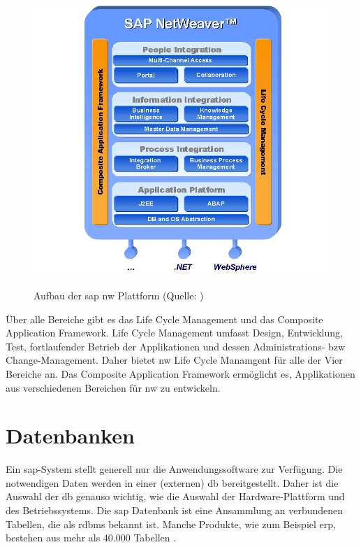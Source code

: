 \begin{figure}[H]
	\begin{center}
	\includegraphics[width=1\linewidth]{grafiken/NetWeaver.png}
	\vspace{-20pt}
	\caption{Aufbau der \gls{sap} \gls{nw} Plattform (Quelle: \cite{NWGrundlagen})}
	\vspace{-10pt}
	\label{abb:SAPNWGrundlagen}
	\end{center}
\end{figure}

Über alle Bereiche gibt es das Life Cycle Management und das Composite Application Framework. Life Cycle Management umfasst Design, Entwicklung, Test, fortlaufender Betrieb der Applikationen und dessen Administrations- \gls{bzw} Change-Management. Daher bietet \gls{nw} Life Cycle Manamgent für alle der Vier Bereiche an.
Das Composite Application Framework ermöglicht es, Applikationen aus verschiedenen Bereichen für \gls{nw} zu entwickeln.

\section{Datenbanken}
Ein \gls{sap}-System stellt generell nur die Anwendungssoftware zur Verfügung. Die notwendigen Daten werden in einer (externen) \gls{db} bereitgestellt. Daher ist die Auswahl der \gls{db} genauso wichtig, wie die Auswahl der Hardware-Plattform und des Betriebssystems.
Die \gls{sap} Datenbank ist eine Ansammlung an verbundenen Tabellen, die als \gls{rdbms} bekannt ist. Manche Produkte, wie zum Beispiel \gls{erp}, bestehen aus mehr als 40.000 Tabellen \cite{SAPin24hrs}.

